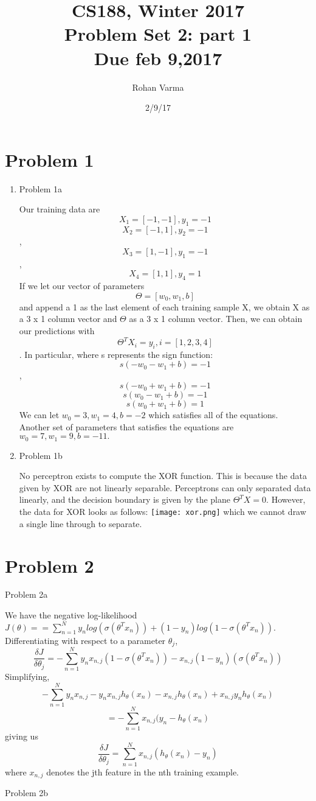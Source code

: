 \documentclass[11pt]{article}
\newcommand{\cnum}{CS188}
\newcommand{\ced}{Winter 2017}
\newcommand{\ctitle}[3]{\title{\vspace{-0.5in}\cnum, \ced\\Problem Set #1: #2\\Due #3}}
\newcommand{\solution}[1]{{{\color{blue}{\bf Solution:} {#1}}}}
\begin{document}
\ctitle{2}{part 1}{feb 9,2017}
\author{Rohan Varma}
\date{2/9/17}
\maketitle
\vspace{-0.75in}

\section{Problem 1}
\begin{enumerate}
\item Problem 1a

\solution{Our training data are \[ X_1 = [-1,-1], y_1 = -1 \] \[ X_2 = [-1, 1], y_2 = -1\], \[X_3 = [1,-1], y_1 = -1\], \[ X_4 = [1,1], y_4 = 1\]
If we let our vector of parameters \[ \Theta = [w_0, w_1, b] \] and append a 1 as the last element of each training sample X, we obtain X as a 3 x 1 column vector and $\Theta$ as a 3 x 1 column vector. Then, we can obtain our predictions with \[ \Theta^{T}X_i = y_i, i = [1,2,3,4] \]. In particular, where s represents the sign function: \[ s(-w_0 -w_1 + b) = -1\], \[s(-w_0 + w_1 + b) = -1 \] \[s(w_0 -w_1 + b) =-1 \] \[s(w_0 + w_1 + b) = 1 \]
We can let $w_0 = 3, w_1 = 4,  b = -2$ which satisfies all of the equations. Another set of parameters that satisfies the equations are $w_0 = 7, w_1 = 9, b = -11. $
}

\vspace{1cm}
\item Problem 1b

\solution{No perceptron exists to compute the XOR function. This is because the data given by XOR are not linearly separable. Perceptrons can only separated data linearly, and the decision boundary is given by the plane $\Theta^TX=0$. However, the data for XOR looks as follows: \texttt{[image: xor.png]} \newline{} which we cannot draw a single line through to separate.}
\end{enumerate}

\newpage
\section{Problem 2}
\item Problem 2a

\solution{
We have the negative log-likelihood $J(\theta) = =\sum_{n=1}^{N} y_nlog(\sigma(\theta^{T}x_n)) + (1-y_n)log(1-\sigma(\theta^{T}x_n))$. Differentiating with respect to a parameter $\theta_j$, 
\[ \frac{\delta J}{\delta \theta_j} = -\sum_{n=1}^{N} y_{n}x_{n,j}(1 - \sigma(\theta^{T}x_n)) - x_{n,j}(1-y_n)(\sigma(\theta^{T}x_n)) \]
Simplifying, 
\[-\sum_{n=1}^{N}y_{n}x_{n,j} - y_{n}x_{n,j}h_{\theta}(x_n) - x_{n,j}h_{\theta}(x_n) + x_{n,j}y_{n}h_{\theta}(x_n) \]
\[ = -\sum_{n=1}^{N}x_{n,j}(y_{n} - h_{\theta}(x_n) \]
giving us
\[ \frac{\delta J}{\delta \theta_j}= \sum_{n=1}^{N} x_{n,j}(h_{\theta}(x_n) - y_n) \]
where $x_{n,j}$ denotes the jth feature in the nth training example. 
}
\vspace{1cm}
\item Problem 2b
\end{document}
